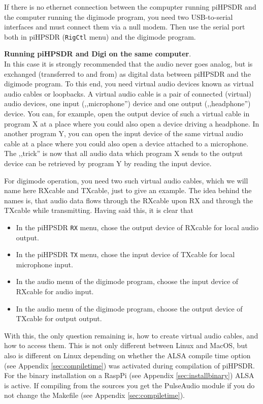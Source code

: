 \documentclass[12pt]{book}
\def\bltt#1{\texttt{\color{blue}#1}}
\begin{document}
If there is no ethernet connection between the compupter running piHPSDR and the computer
running the digimode program, you need two USB-to-serial interfaces and must connect them
via a null modem. Then use the serial port both in piHPSDR (\bltt{RigCtl} menu) and the
digimode program.

\textbf{\color{red}Running piHPSDR and Digi on the same computer}. \\
In this case it is strongly recommended that the audio never goes analog, but is
exchanged (transferred to and from)
as digital data between piHPSDR and the digimode program. To this end, you need
virtual audio devices known as {\color{red} virtual audio cables} or {\color{red}
loopbacks}. A virtual audio cable is a pair of connected (virtual) audio devices,
one input (,,microphone'') device and one output (,,headphone'') device. You can,
for example, open the output device of such a virtual cable in program X at a place
where you could also open a device driving a headphone. In another program Y, you can
open the input device of the same virtual audio cable at a place where you could also
open a device attached to a microphone. The ,,trick'' is now that all audio data which
program X sends to the output device can be retrieved by program Y by reading the input device.



For digimode operation, you need two such virtual audio cables, which we will name here
RXcable and TXcable, just to give an example. The idea behind the names is, that audio data
flows through the RXcable upon RX and through the TXcable while transmitting. Having said this,
it is clear that

\begin{itemize}
\item{In the piHPSDR \bltt{RX} menu, chose the output device of RXcable for local audio output.}
\item{In the piHPSDR \bltt{TX} menu, chose the input device of TXcable for local microphone input.}
\item{In the audio menu of the digimode program, choose the input device of RXcable for audio input.}
\item{In the audio menu of the digimode program, choose the output device of TXcable for output output.}
\end{itemize}

With this, the only question remaining is, how to create virtual audio cables, and how to access them.
This is not only different between Linux and MacOS, but also is different on Linux depending on
whether the ALSA compile time option (see Appendix \ref{sec:compiletime}) was activated during
compilation of piHPSDR. For the binary installation on a RaspPi (see Appendix \ref{sec:installbinary})
ALSA is active. If compiling from the sources you get the PulseAudio module if you
do not change the Makefile (see Appendix \ref{sec:compiletime}).
\end{document}
